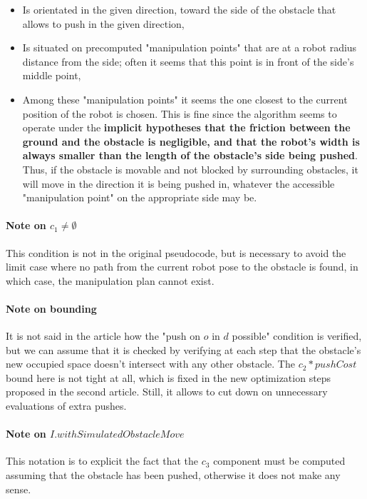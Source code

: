 \begin{itemize}
  \item Is orientated in the given direction, toward the side of the obstacle that allows to push in the given direction,
  \item Is situated on precomputed "manipulation points" that are at a robot radius distance from the side; often it seems that this point is in front of the side's middle point,
  \item Among these "manipulation points" it seems the one closest to the current position of the robot is chosen. This is fine since the algorithm seems to operate under the \textbf{implicit hypotheses that the friction between the ground and the obstacle is negligible, and that the robot's width is always smaller than the length of the obstacle's side being pushed}. Thus, if the obstacle is movable and not blocked by surrounding obstacles, it will move in the direction it is being pushed in, whatever the accessible "manipulation point" on the appropriate side may be.
\end{itemize}

\paragraph{Note on $c_{1} \neq \emptyset$}\label{c1_note} This condition is not in the original pseudocode, but is necessary to avoid the limit case where no path from the current robot pose to the obstacle is found, in which case, the manipulation plan cannot exist.

\paragraph{Note on bounding}\label{bound_note} It is not said in the article how the "push on $o$ in $d$ possible" condition is verified, but we can assume that it is checked by verifying at each step that the obstacle's new occupied space doesn't intersect with any other obstacle. The $c_{2} * pushCost$ bound here is not tight at all, which is fixed in the new optimization steps proposed in the second article. Still, it allows to cut down on unnecessary evaluations of extra pushes.

\paragraph{Note on $I.withSimulatedObstacleMove$}\label{i_note} This notation is to explicit the fact that the $c_{3}$ component must be computed assuming that the obstacle has been pushed, otherwise it does not make any sense.

